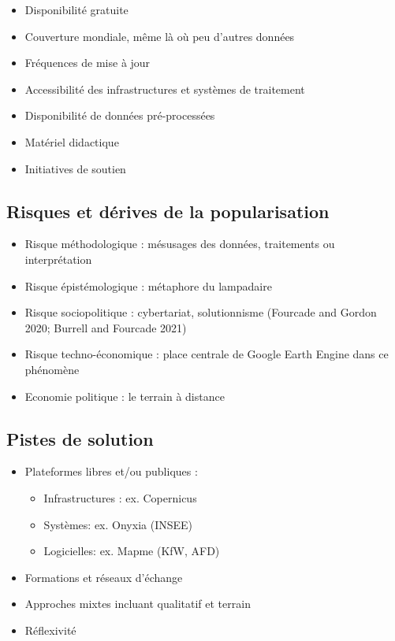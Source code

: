 \documentclass[
  letterpaper,
  DIV=11,
  numbers=noendperiod]{scrartcl}
\providecommand{\tightlist}{%
  \setlength{\itemsep}{0pt}\setlength{\parskip}{0pt}}\usepackage{longtable,booktabs,array}
\begin{document}
\begin{itemize}
\tightlist
\item
  Disponibilité gratuite
\item
  Couverture mondiale, même là où peu d'autres données
\item
  Fréquences de mise à jour
\item
  Accessibilité des infrastructures et systèmes de traitement
\item
  Disponibilité de données pré-processées
\item
  Matériel didactique
\item
  Initiatives de soutien
\end{itemize}

\hypertarget{risques-et-duxe9rives-de-la-popularisation}{%
\subsection{Risques et dérives de la
popularisation}\label{risques-et-duxe9rives-de-la-popularisation}}

\begin{itemize}
\item
  Risque méthodologique : mésusages des données, traitements ou
  interprétation
\item
  Risque épistémologique : métaphore du lampadaire
\item
  Risque sociopolitique : cybertariat, solutionnisme (Fourcade and
  Gordon 2020; Burrell and Fourcade 2021)
\item
  Risque techno-économique : place centrale de Google Earth Engine dans
  ce phénomène
\item
  Economie politique : le terrain à distance
\end{itemize}

\hypertarget{pistes-de-solution}{%
\subsection{Pistes de solution}\label{pistes-de-solution}}

\begin{itemize}
\item
  Plateformes libres et/ou publiques :

  \begin{itemize}
  \tightlist
  \item
    Infrastructures : ex. Copernicus
  \item
    Systèmes: ex. Onyxia (INSEE)
  \item
    Logicielles: ex. Mapme (KfW, AFD)
  \end{itemize}
\item
  Formations et réseaux d'échange
\item
  Approches mixtes incluant qualitatif et terrain
\item
  Réflexivité
\end{itemize}
\end{document}
